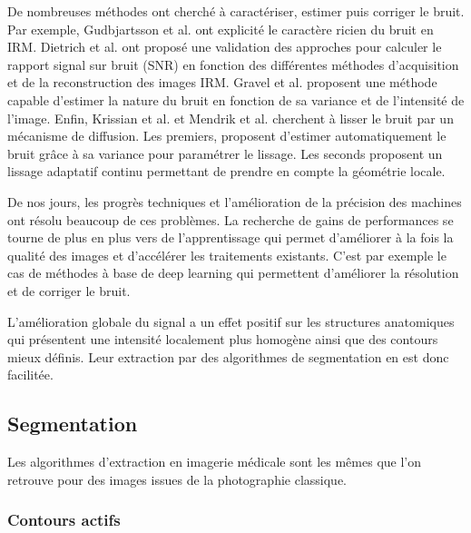     De nombreuses méthodes ont cherché à caractériser, estimer puis corriger le bruit. Par exemple, Gudbjartsson et al. \cite{Gudbjartsson1995r_Rician_noise_MRI} ont explicité le caractère ricien du bruit en IRM. Dietrich et al. \cite{Dietrich2007_measurement_MR_noise} ont proposé une validation des approches pour calculer le rapport signal sur bruit (SNR) en fonction des différentes méthodes d'acquisition et de la reconstruction des images IRM. Gravel et al. \cite{Gravel_2004_estimate_noise_medical_img} proposent une méthode capable d'estimer la nature du bruit en fonction de sa variance et de l'intensité de l'image. Enfin, Krissian et al. \cite{Krissian_2009_diffusion_MRI} et Mendrik et al. \cite{Mendrik2009_HDCS} cherchent à lisser le bruit par un mécanisme de diffusion. Les premiers, proposent d'estimer automatiquement le bruit grâce à sa variance pour paramétrer le lissage. Les seconds proposent un lissage adaptatif continu permettant de prendre en compte la géométrie locale.    
    
    De nos jours, les progrès techniques et l'amélioration de la précision des machines ont résolu beaucoup de ces problèmes. La recherche de gains de performances se tourne de plus en plus vers de l'apprentissage qui permet d'améliorer à la fois la qualité des images et d'accélérer les traitements existants. C'est par exemple le cas de méthodes à base de deep learning \cite{Higaki2019_deep_MRI_CT_quality} qui permettent d'améliorer la résolution et de corriger le bruit.

    L'amélioration globale du signal a un effet positif sur les structures anatomiques qui présentent une intensité localement plus homogène ainsi que des contours mieux définis. Leur extraction par des algorithmes de segmentation en est donc facilitée.

    \subsection{Segmentation}

      Les algorithmes d'extraction en imagerie médicale sont les mêmes que l'on retrouve pour des images issues de la photographie classique. 


      \subsubsection{Contours actifs}

